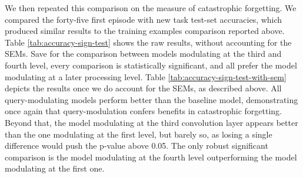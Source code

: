 We then repeated this comparison on the measure of catastrophic forgetting. We compared the forty-five first episode with new task test-set accuracies, which produced similar results to the training examples comparison reported above. Table \ref{tab:accuracy-sign-test} shows the raw results, without accounting for the SEMs. Save for the comparison between models modulating at the third and fourth level, every comparison is statistically significant, and all prefer the model modulating at a later processing level. Table \ref{tab:accuracy-sign-test-with-sem} depicts the results once we do account for the SEMs, as described above. All query-modulating models perform better than the baseline model, demonstrating once again that query-modulation confers benefits in catastrophic forgetting. Beyond that, the model modulating at the third convolution layer appears better than the one modulating at the first level, but barely so, as losing a single difference would push the p-value above 0.05. The only robust significant comparison is the model modulating at the fourth level outperforming the model modulating at the first one.
